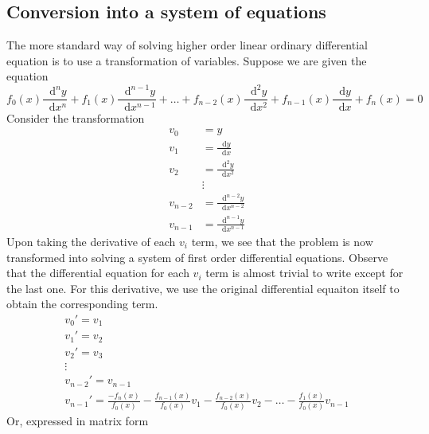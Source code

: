 \documentclass[]{article}
\theoremstyle{definition}
\newcommand*\diff{\mathop{}\!\mathrm{d}}
\numberwithin{equation}{section}
\begin{document}
\subsection{Conversion into a system of equations}
The more standard way of solving higher order linear ordinary differential equation is to use a transformation of variables. Suppose we are given the equation
\begin{equation}
	f_0(x) \frac{\diff^n y}{\diff x^n}  + f_1(x) \frac{\diff^{n-1}y}{\diff x^{n-1}} + \ldots + f_{n-2}(x) \frac{\diff^2y}{\diff x^2} + f_{n-1}(x) \frac{\diff y}{\diff x} + f_{n}(x) = 0
\end{equation}
Consider the transformation
\begin{align*}
	v_0 &= y \\
	v_1 &= \frac{\diff y }{\diff x} \\
	v_2 &= \frac{\diff^2 y}{\diff x^2} \\
	&\vdots \\
	 v_{n-2} &= \frac{\diff^{n-2}y}{\diff x^{n-2}}  \\
	 v_{n-1} &= \frac{\diff^{n-1}y}{\diff x^{n-1}}
\end{align*}
Upon taking the derivative of each $v_i$ term, we see that the problem is now transformed into solving a system of first order differential equations. Observe that the differential equation for each $v_i$ term is almost trivial to write except for the last one. For this derivative, we use the original differential equaiton itself to obtain the corresponding term.
\begin{gather*}
	v_0' = v_1 \\
	v_1' = v_2 \\
	v_2' = v_3 \\
	 \vdots \\
	v_{n-2}' = v_{n-1} \\
	v_{n-1}' = \frac{-f_n(x)}{f_0(x)} - \frac{f_{n-1}(x)}{f_0(x)} v_1 - \frac{f_{n-2}(x)}{f_0(x)} v_2 - \ldots - \frac{f_1(x)}{f_0(x)} v_{n-1}
\end{gather*}
Or, expressed in matrix form
\end{document}
